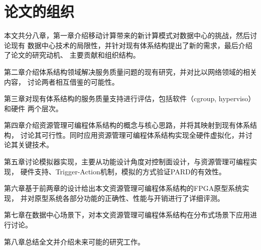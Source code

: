 \section{论文的组织}

本文共分八章，第一章介绍移动计算带来的新计算模式对数据中心的挑战，然后讨论现有
数据中心技术的局限性，并针对现有体系结构提出了新的需求，最后介绍了论文的研究动机、
主要贡献和组织结构。

第二章介绍体系结构领域解决服务质量问题的现有研究，并对比以网络领域的相关内容，
讨论两者相互借鉴的可能性。

第三章对现有体系结构的服务质量支持进行评估，包括软件（cgroup, hyperviso）和硬件
两个层次。

第四章介绍资源管理可编程体系结构的概念与核心思路，并将其映射到现有体系结构，
讨论其可行性。同时应用资源管理可编程体系结构实现全硬件虚拟化，并讨论其关键技术。

第五章讨论模拟器实现，主要从功能设计角度对控制面设计，与资源管理可编程实现，
硬件支持、Trigger-Action机制，模拟的方式验证PARD的有效性。

第六章基于前两章的设计给出本文资源管理可编程体系结构的FPGA原型系统实现，
并对原型系统各部分功能的正确性、性能与开销进行了详细评测。

第七章在数据中心场景下，对本文资源管理可编程体系结构在分布式场景下应用进行讨论。

第八章总结全文并介绍未来可能的研究工作。
